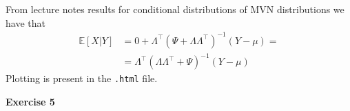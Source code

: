 \documentclass[10pt,notitlepage]{article}
\newcommand{\MBlue}[1]{{\color{MBlue}#1}}
\newcommand{\mean}[1]{\mathbb{E}\left[#1\right]}
\begin{document}
\begin{exercise}[Solution]
\begin{enumerate}[(a)]
                    From lecture notes results for conditional distributions of MVN distributions we have that
                    \begin{align*}
                        \mean{X\vert Y} &= 0 + \Lambda^\top(\Psi + \Lambda\Lambda^\top)^{-1}\left(Y-\mu\right) =\\
                        &= \Lambda^\top(\Lambda\Lambda^\top + \Psi)^{-1}\left(Y-\mu\right)
                    \end{align*}
                    Plotting is present in the \texttt{.html} file.
        \end{enumerate}
    \end{exercise}

    \newpage
    \textbf{\large \MBlue{Exercise 5}}
    \vskip10pt
    \noindent
	\begin{exercise}[Solution]
    \end{exercise}
\end{document}
